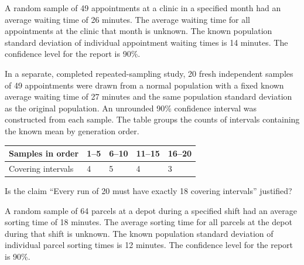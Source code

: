 \clearpage
{}
A random sample of 49 appointments at a clinic in a specified month had an average waiting time of 26 minutes. The average waiting time for all appointments at the clinic that month is unknown. The known population standard deviation of individual appointment waiting times is 14 minutes. The confidence level for the report is 90\%.

In a separate, completed repeated-sampling study, 20 fresh independent samples of 49 appointments were drawn from a normal population with a fixed known average waiting time of 27 minutes and the same population standard deviation as the original population. An unrounded 90\% confidence interval was constructed from each sample. The table groups the counts of intervals containing the known mean by generation order.

\begin{center}\begin{tabular}{@{}lllll@{}}\toprule
Samples in order & 1--5 & 6--10 & 11--15 & 16--20\\\midrule
Covering intervals & 4 & 5 & 4 & 3\\
\bottomrule\end{tabular}\end{center}


\BlankInformationTable
\clearpage
{}

Is the claim ``Every run of 20 must have exactly 18 covering intervals'' justified?

\workspace{1.5in}
\vfill

\clearpage
{}
A random sample of 64 parcels at a depot during a specified shift had an average sorting time of 18 minutes. The average sorting time for all parcels at the depot during that shift is unknown. The known population standard deviation of individual parcel sorting times is 12 minutes. The confidence level for the report is 90\%.

